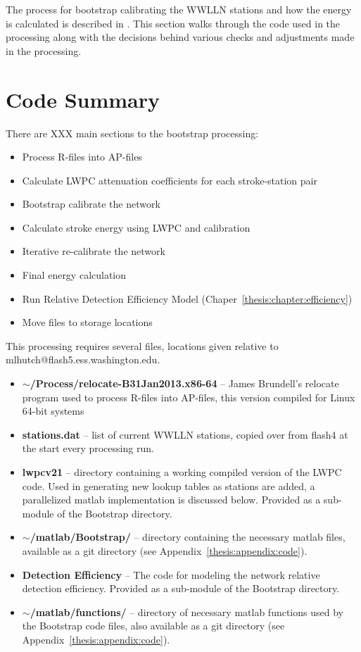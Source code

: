 The process for bootstrap calibrating the WWLLN stations and how the energy is calculated is described in \citet{Hutchins2012}.
This section walks through the code used in the processing along with the decisions behind various checks and adjustments made in the processing.

\section{Code Summary}

There are XXX main sections to the bootstrap processing:

\begin{itemize}
	\item{Process R-files into AP-files}
	\item{Calculate LWPC attenuation coefficients for each stroke-station pair}
	\item{Bootstrap calibrate the network}
	\item{Calculate stroke energy using LWPC and calibration}
	\item{Iterative re-calibrate the network}
	\item{Final energy calculation}
	\item{Run Relative Detection Efficiency Model (Chaper~\ref{thesis:chapter:efficiency})}
	\item{Move files to storage locations}
\end{itemize}

This processing requires several files, locations given relative to mlhutch@flash5.ess.washington.edu.

\begin{itemize}
	\item{\textbf{$\sim$/Process/relocate-B31Jan2013.x86-64} -- James Brundell's relocate program used to process R-files into AP-files, this version compiled for Linux 64-bit systems}
	\item{\textbf{stations.dat} -- list of current WWLLN stations, copied over from flash4 at the start every processing run.}
	\item{\textbf{lwpcv21} -- directory containing a working compiled version of the LWPC code.
		Used in generating new lookup tables as stations are added, a parallelized matlab implementation is discussed below.
		Provided as a sub-module of the Bootstrap directory.}
	\item{\textbf{$\sim$/matlab/Bootstrap/} -- directory containing the necessary matlab files, available as a git directory (see Appendix~\ref{thesis:appendix:code}).}
	\item{\textbf{Detection Efficiency} -- The code for modeling the network relative detection efficiency.
		Provided as a sub-module of the Bootstrap directory.}
	\item{\textbf{$\sim$/matlab/functions/} -- directory of necessary matlab functions used by the Bootstrap code files, also available as a git directory (see Appendix~\ref{thesis:appendix:code}).}
\end{itemize}

